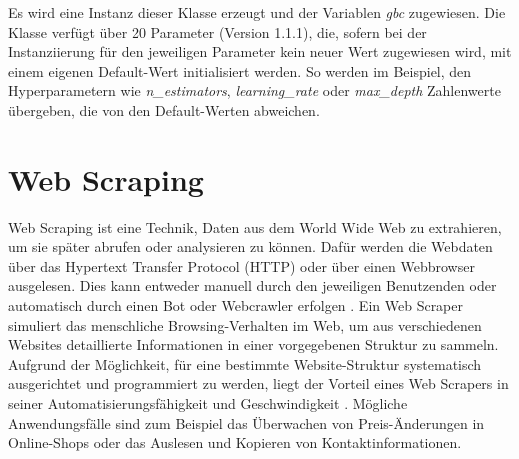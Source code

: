 \documentclass[german,bachelor]{swsLeipzig}
\begin{document}
\noindent Es wird eine Instanz dieser Klasse erzeugt und der Variablen \textit{gbc} zugewiesen.
Die Klasse verfügt über 20 Parameter (Version 1.1.1), die, sofern bei der Instanziierung für den jeweiligen Parameter
kein neuer Wert zugewiesen wird, mit einem eigenen Default-Wert initialisiert werden.
So werden im Beispiel, den Hyperparametern wie \textit{n\_estimators}, \textit{learning\_rate} oder \textit{max\_depth}
Zahlenwerte übergeben, die von den Default-Werten abweichen.\\

\section{Web Scraping}
Web Scraping ist eine Technik, Daten aus dem World Wide Web zu extrahieren, um sie später abrufen oder analysieren zu können.
Dafür werden die Webdaten über das Hypertext Transfer Protocol (HTTP) oder über einen Webbrowser ausgelesen.
Dies kann entweder manuell durch den jeweiligen Benutzenden oder automatisch durch einen Bot oder Webcrawler erfolgen \cite[]{zhao2017web}.
Ein Web Scraper simuliert das menschliche Browsing-Verhalten im Web, um aus verschiedenen Websites
detaillierte Informationen in einer vorgegebenen Struktur zu sammeln.
Aufgrund der Möglichkeit, für eine bestimmte Website-Struktur systematisch ausgerichtet und programmiert zu werden, liegt der Vorteil
eines Web Scrapers in seiner Automatisierungsfähigkeit und Geschwindigkeit \cite[]{9005594}.
Mögliche Anwendungsfälle sind zum Beispiel das Überwachen von Preis-Änderungen in Online-Shops oder das Auslesen und Kopieren
von Kontaktinformationen.\\
\end{document}
